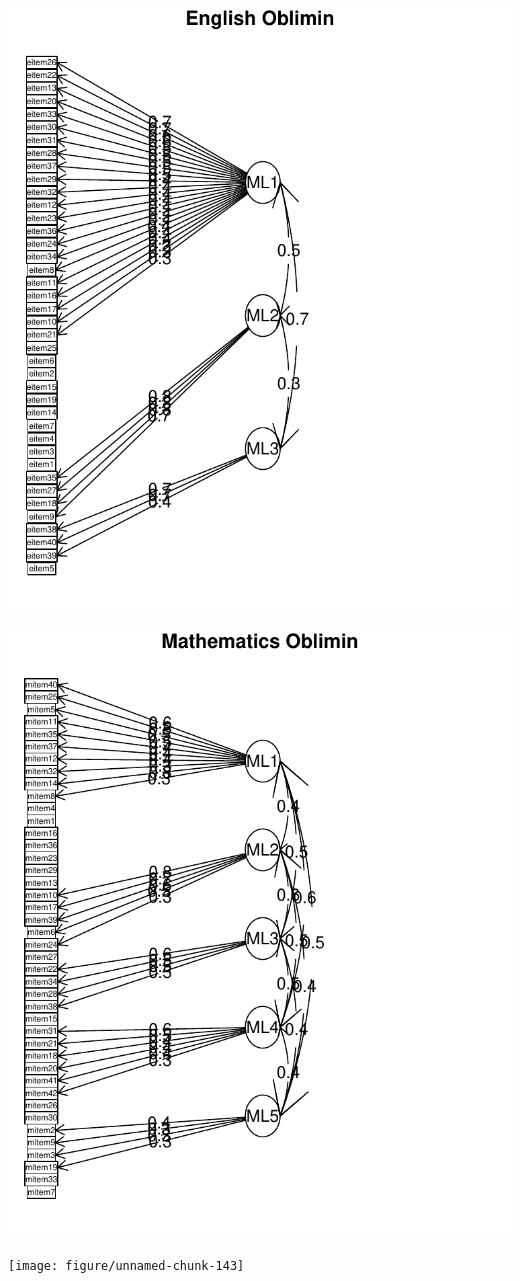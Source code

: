 \documentclass{article}\usepackage[]{graphicx}\usepackage[]{color}
\makeatletter
\def\maxwidth{ %
  \ifdim\Gin@nat@width>\linewidth
    \linewidth
  \else
    \Gin@nat@width
  \fi
}
\newenvironment{knitrout}{}{} %
\makeatother
\begin{document}
\begin{knitrout}
\color{fgcolor}
\includegraphics[width=\maxwidth]{figure/unnamed-chunk-141} 

\includegraphics[width=\maxwidth]{figure/unnamed-chunk-142} 

\texttt{[image: figure/unnamed-chunk-143]} 

\end{knitrout}
\end{document}
